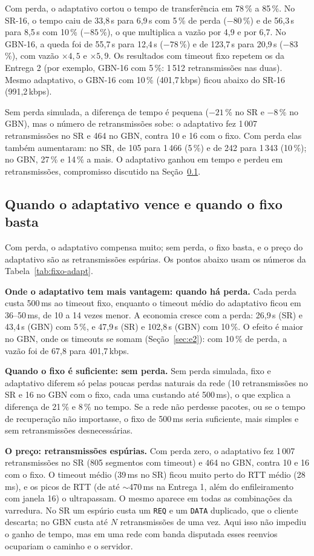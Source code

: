 \documentclass[11pt,a4paper]{article}
\newcommand{\cod}[1]{\textcolor{codverde}{\texttt{\small #1}}}
\begin{document}
Com perda, o adaptativo cortou o tempo de transferência em 78\,\% a 85\,\%. No SR-16, o tempo caiu de
33,8\,s para 6,9\,s com 5\,\% de perda ($-80$\,\%) e de 56,3\,s para 8,5\,s com 10\,\% ($-85$\,\%), o
que multiplica a vazão por 4,9 e por 6,7. No GBN-16, a queda foi de 55,7\,s para 12,4\,s ($-78$\,\%)
e de 123,7\,s para 20,9\,s ($-83$\,\%), com vazão $\times 4{,}5$ e $\times 5{,}9$. Os resultados com
timeout fixo repetem os da Entrega 2 (por exemplo, GBN-16 com 5\,\%: 1\,512 retransmissões nas
duas). Mesmo adaptativo, o GBN-16 com 10\,\% (401,7\,kbps) ficou abaixo do SR-16 (991,2\,kbps).

Sem perda simulada, a diferença de tempo é pequena ($-21$\,\% no SR e $-8$\,\% no GBN), mas o número
de retransmissões sobe: o adaptativo fez 1\,007 retransmissões no SR e 464 no GBN, contra 10 e 16 com
o fixo. Com perda elas também aumentaram: no SR, de 105 para 1\,466 (5\,\%) e de 242 para 1\,343
(10\,\%); no GBN, 27\,\% e 14\,\% a mais. O adaptativo ganhou em tempo e perdeu em retransmissões,
compromisso discutido na Seção~\ref{sec:fixo-basta}.

\subsection{Quando o adaptativo vence e quando o fixo basta}\label{sec:fixo-basta}

Com perda, o adaptativo compensa muito; sem perda, o fixo basta, e o preço do adaptativo são as
retransmissões espúrias. Os pontos abaixo usam os números da Tabela~\ref{tab:fixo-adapt}.

\textbf{Onde o adaptativo tem mais vantagem: quando há perda.} Cada perda custa 500\,ms ao timeout
fixo, enquanto o timeout médio do adaptativo ficou em 36--50\,ms, de 10 a 14 vezes menor. A economia
cresce com a perda: 26,9\,s (SR) e 43,4\,s (GBN) com 5\,\%, e 47,9\,s (SR) e 102,8\,s (GBN) com
10\,\%. O efeito é maior no GBN, onde os timeouts se somam (Seção~\ref{sec:e2}): com 10\,\% de perda,
a vazão foi de 67,8 para 401,7\,kbps.

\textbf{Quando o fixo é suficiente: sem perda.} Sem perda simulada, fixo e adaptativo diferem só
pelas poucas perdas naturais da rede (10 retransmissões no SR e 16 no GBN com o fixo, cada uma
custando até 500\,ms), o que explica a diferença de 21\,\% e 8\,\% no tempo. Se a rede não perdesse
pacotes, ou se o tempo de recuperação não importasse, o fixo de 500\,ms seria suficiente, mais simples
e sem retransmissões desnecessárias.

\textbf{O preço: retransmissões espúrias.} Com perda zero, o adaptativo fez 1\,007 retransmissões no
SR (805 segmentos com timeout) e 464 no GBN, contra 10 e 16 com o fixo. O timeout médio (39\,ms no SR)
ficou muito perto do RTT médio (28\,ms), e os picos de RTT (de até $\sim$470\,ms na Entrega 1, além
do enfileiramento com janela 16) o ultrapassam. O mesmo aparece em todas as combinações da varredura.
No SR um espúrio custa um \cod{REQ} e um \cod{DATA} duplicado, que o cliente descarta; no GBN custa
até $N$ retransmissões de uma vez. Aqui isso não impediu o ganho de tempo, mas em uma rede com banda
disputada esses reenvios ocupariam o caminho e o servidor.
\end{document}
